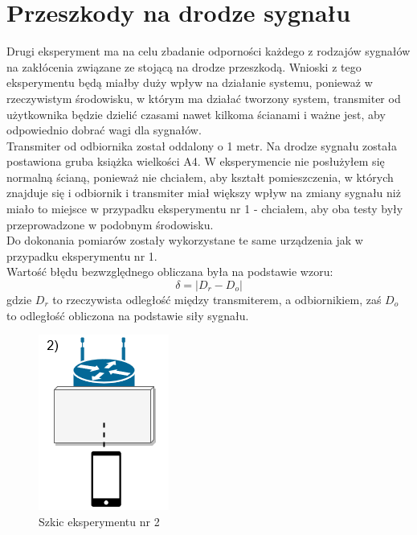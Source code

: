 \section{Przeszkody na drodze sygnału}
Drugi eksperyment ma na celu zbadanie odporności każdego z rodzajów sygnałów na zakłócenia związane ze stojącą na drodze przeszkodą. Wnioski z tego eksperymentu będą miałby duży wpływ na działanie systemu, ponieważ w rzeczywistym środowisku, w którym ma działać tworzony system, transmiter od użytkownika będzie dzielić czasami nawet kilkoma ścianami i ważne jest, aby odpowiednio dobrać wagi dla sygnałów.\\
Transmiter od odbiornika został oddalony o 1 metr. Na drodze sygnału została postawiona gruba książka wielkości A4. W eksperymencie nie posłużyłem się normalną ścianą, ponieważ nie chciałem, aby kształt pomieszczenia, w których znajduje się i odbiornik i transmiter miał większy wpływ na zmiany sygnału niż miało to miejsce w przypadku eksperymentu nr 1 - chciałem, aby oba testy były przeprowadzone w podobnym środowisku.\\
Do dokonania pomiarów zostały wykorzystane te same urządzenia jak w przypadku eksperymentu nr 1.\\
Wartość błędu bezwzględnego obliczana była na podstawie wzoru:
\begin{equation}
\delta = |D_r - D_o|
\end{equation}
gdzie $D_r$ to rzeczywista odległość między transmiterem, a odbiornikiem, zaś $D_o$ to odległość obliczona na podstawie siły sygnału.
\begin{figure}[H]
	\centering			
	\caption{Szkic eksperymentu nr 2}
	\includegraphics{exper2}
\end{figure}
